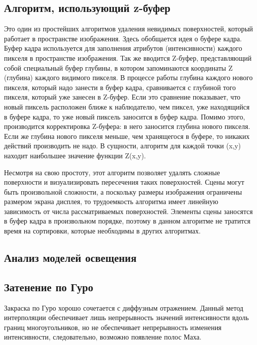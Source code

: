 \subsection*{Алгоритм, использующий z-буфер}
Это один из простейших алгоритмов удаления невидимых поверхностей, который работает в пространстве изображения. Здесь обобщается идея о буфере кадра. Буфер кадра используется для заполнения атрибутов (интенсивности) каждого пикселя в пространстве изображения. Так же вводится Z-буфер, представляющий собой специальный буфер глубины, в котором запоминаются координаты Z (глубина) каждого видимого пикселя. В процессе работы глубина каждого нового пикселя, который надо занести в буфер кадра, сравнивается с глубиной того пикселя, который уже занесен в Z-буфер. Если это сравнение показывает, что новый пиксель расположен ближе к наблюдателю, чем пиксел, уже находящийся в буфере кадра, то уже новый пиксель заносится в буфер кадра. Помимо этого, производится корректировка Z-буфера: в него заносится глубина нового пикселя. Если же глубина нового пикселя меньше, чем хранящегося в буфере, то никаких действий производить не надо. В сущности, алгоритм для каждой точки (x,y) находит наибольшее значение функции Z(x,y).

Несмотря на свою простоту, этот алгоритм позволяет удалять сложные поверхности и визуализировать пересечения таких поверхностей. Сцены могут быть произвольной сложности, а поскольку размеры изображения ограничены размером экрана дисплея, то трудоемкость алгоритма имеет линейную зависимость от числа рассматриваемых поверхностей. Элементы сцены заносятся в буфер кадра в произвольном порядке, поэтому в данном алгоритме не тратится время на сортировки, которые необходимы в других алгоритмах.

\subsection{Анализ моделей освещения}

\subsection*{Затенение по Гуро}
Закраска по Гуро хорошо сочетается с диффузным отражением. Данный метод интерполяции обеспечивает лишь непрерывность значений интенсивности вдоль границ многоугольников, но не обеспечивает непрерывность изменения интенсивности, следовательно, возможно появление полос Маха.

